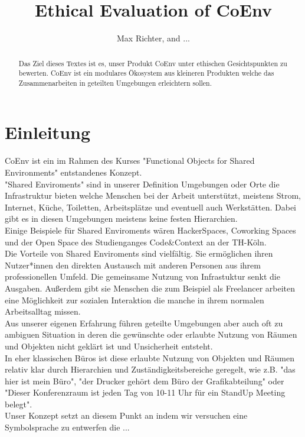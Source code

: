 \documentclass{article}
\title{Ethical Evaluation of CoEnv}
\author{Max Richter, and ...}
\begin{document}
\maketitle

\begin{abstract}
Das Ziel dieses Textes ist es, unser Produkt CoEnv unter ethischen Gesichtspunkten zu bewerten. CoEnv ist ein modulares Ökosystem aus kleineren Produkten welche das Zusammenarbeiten in geteilten Umgebungen erleichtern sollen.
\end{abstract}

\newpage

\section{Einleitung}

CoEnv ist ein im Rahmen des Kurses "Functional Objects for Shared Environments" entstandenes Konzept.
\\[2ex]
"Shared Enviroments" sind in unserer Definition Umgebungen oder Orte die Infrastruktur bieten welche Menschen bei der Arbeit unterstützt, meistens Strom, Internet, Küche, Toiletten, Arbeitsplätze und eventuell auch Werkstätten. Dabei gibt es in diesen Umgebungen meistens keine festen Hierarchien.
\\[2ex]
Einige Beispiele für Shared Enviroments wären HackerSpaces, Coworking Spaces und der Open Space des Studienganges Code\&Context an der TH-Köln.
\\[2ex]
Die Vorteile von Shared Enviroments sind vielfältig. Sie ermöglichen ihren Nutzer*innen den direkten Austausch mit anderen Personen aus ihrem professionellen Umfeld. Die gemeinsame Nutzung von Infrastuktur senkt die Ausgaben. Außerdem gibt sie Menschen die zum Beispiel als Freelancer arbeiten eine Möglichkeit zur sozialen Interaktion die manche in ihrem normalen Arbeitsalltag missen.
\\[2ex]
Aus unserer eigenen Erfahrung führen geteilte Umgebungen aber auch oft zu ambiguen Situation in deren die gewünschte oder erlaubte Nutzung von Räumen und Objekten nicht geklärt ist und Unsicherheit entsteht.
\\[2ex]
In eher klassischen Büros ist diese erlaubte Nutzung von Objekten und Räumen relativ klar durch Hierarchien und Zuständigkeitsbereiche geregelt, wie z.B. "das hier ist mein Büro", "der Drucker gehört dem Büro der Grafikabteilung" oder "Dieser Konferenzraum ist jeden Tag von 10-11 Uhr für ein StandUp Meeting belegt".
\\[2ex]
Unser Konzept setzt an diesem Punkt an indem wir versuchen eine Symbolsprache zu entwerfen die ... 
\end{document}

